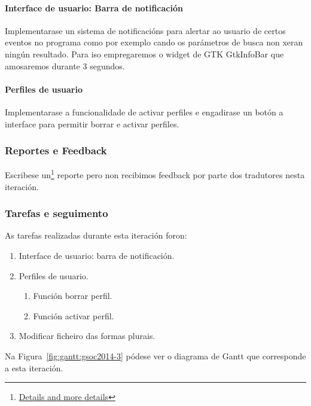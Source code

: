 \paragraph{Interface de usuario: Barra de notificación} Implementarase un sistema de notificacións para alertar ao usuario de certos eventos no programa como por exemplo cando os parámetros de busca non xeran ningún resultado. Para iso empregaremos o widget de GTK GtkInfoBar que amosaremos durante 3 segundos.

\paragraph{Perfiles de usuario} Implementarase a funcionalidade de activar perfiles e engadirase un botón a interface para permitir borrar e activar perfiles.

\subsubsection{Reportes e Feedback}

Escribese un\footnote{\href{http://aquelando.info/details-and-more-details/}{Details and more details}} reporte pero non recibimos feedback por parte dos tradutores nesta iteración.

\subsubsection{Tarefas e seguimento}

As tarefas realizadas durante esta iteración foron:

\begin{enumerate}[label=\bfseries WBS 3.\arabic*]
  \item Interface de usuario: barra de notificación.
  \item Perfiles de usuario.
    \begin{enumerate}[label=\bfseries WBS 3.2\arabic*]
      \item Función borrar perfil.
      \item Función activar perfil.
    \end{enumerate}
  \item Modificar ficheiro das formas plurais.
\end{enumerate}

Na Figura~\ref{fig:gantt:gsoc2014-3} pódese ver o diagrama de Gantt que corresponde a esta iteración.

